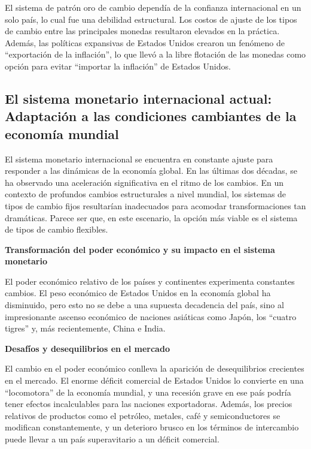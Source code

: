 \documentclass[
  letterpaper,
  DIV=11,
  numbers=noendperiod]{scrartcl}
\begin{document}
El sistema de patrón oro de cambio dependía de la confianza
internacional en un solo país, lo cual fue una debilidad estructural.
Los costos de ajuste de los tipos de cambio entre las principales
monedas resultaron elevados en la práctica. Además, las políticas
expansivas de Estados Unidos crearon un fenómeno de ``exportación de la
inflación'', lo que llevó a la libre flotación de las monedas como
opción para evitar ``importar la inflación'' de Estados Unidos.

\hypertarget{el-sistema-monetario-internacional-actual-adaptaciuxf3n-a-las-condiciones-cambiantes-de-la-economuxeda-mundial}{%
\subsection{El sistema monetario internacional actual: Adaptación a las
condiciones cambiantes de la economía
mundial}\label{el-sistema-monetario-internacional-actual-adaptaciuxf3n-a-las-condiciones-cambiantes-de-la-economuxeda-mundial}}

El sistema monetario internacional se encuentra en constante ajuste para
responder a las dinámicas de la economía global. En las últimas dos
décadas, se ha observado una aceleración significativa en el ritmo de
los cambios. En un contexto de profundos cambios estructurales a nivel
mundial, los sistemas de tipos de cambio fijos resultarían inadecuados
para acomodar transformaciones tan dramáticas. Parece ser que, en este
escenario, la opción más viable es el sistema de tipos de cambio
flexibles.

\textbf{Transformación del poder económico y su impacto en el sistema
monetario}

El poder económico relativo de los países y continentes experimenta
constantes cambios. El peso económico de Estados Unidos en la economía
global ha disminuido, pero esto no se debe a una supuesta decadencia del
país, sino al impresionante ascenso económico de naciones asiáticas como
Japón, los ``cuatro tigres'' y, más recientemente, China e India.

\textbf{Desafíos y desequilibrios en el mercado}

El cambio en el poder económico conlleva la aparición de desequilibrios
crecientes en el mercado. El enorme déficit comercial de Estados Unidos
lo convierte en una ``locomotora'' de la economía mundial, y una
recesión grave en ese país podría tener efectos incalculables para las
naciones exportadoras. Además, los precios relativos de productos como
el petróleo, metales, café y semiconductores se modifican
constantemente, y un deterioro brusco en los términos de intercambio
puede llevar a un país superavitario a un déficit comercial.
\end{document}

